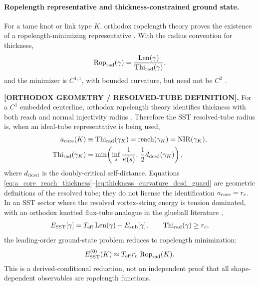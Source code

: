 \documentclass[11pt]{article}
\theoremstyle{definition}
\theoremstyle{plain}
\theoremstyle{remark}
\newcommand{\rc}{{r_c}}
\begin{document}
        \paragraph{Ropelength representative and thickness-constrained ground state.}
        For a tame knot or link type \(K\), orthodox ropelength theory proves the
        existence of a ropelength-minimizing representative
        \cite{CantarellaKusnerSullivan2002,DenneDiaoSullivan2006}.
        With the radius convention for thickness,
        \begin{align}
            \operatorname{Rop}_{\rm rad}(\gamma)
            =
            \frac{\operatorname{Len}(\gamma)}
                 {\operatorname{Thi}_{\rm rad}(\gamma)} ,
        \end{align}
        and the minimizer is \(C^{1,1}\), with bounded curvature, but need not be
        \(C^2\) \cite{CantarellaKusnerSullivan2002}.

        \textbf{[ORTHODOX GEOMETRY / RESOLVED-TUBE DEFINITION].}
        For a \(C^1\) embedded centerline, orthodox ropelength theory identifies
        thickness with both reach and normal injectivity radius
        \cite{CantarellaKusnerSullivan2002}.  Therefore the SST resolved-tube
        radius is, when an ideal-tube representative is being used,
        \begin{align}
            a_{\rm core}(K)
            &\equiv
            \operatorname{Thi}_{\rm rad}(\gamma_K)
            =
            \operatorname{reach}(\gamma_K)
            =
            \operatorname{NIR}(\gamma_K),
            \label{eq:a_core_reach_thickness}\\
            \operatorname{Thi}_{\rm rad}(\gamma_K)
            &=
            \min\!\left(\inf_s\frac{1}{\kappa(s)},\,
            \frac12 d_{\rm dcsd}(\gamma_K)\right),
            \label{eq:thickness_curvature_dcsd_guard}
        \end{align}
        where \(d_{\rm dcsd}\) is the doubly-critical self-distance.  Equations
        \eqref{eq:a_core_reach_thickness}--\eqref{eq:thickness_curvature_dcsd_guard}
        are geometric definitions of the resolved tube; they do not license the
        identification \(a_{\rm core}=\rc\).
        In an SST sector where the resolved vortex-string energy is
        tension dominated, with an orthodox knotted flux-tube analogue in the
        glueball literature \cite{BuniyKephart2003},
        \begin{align}
            E_{\rm SST}[\gamma]
            =
            T_{\rm eff}\operatorname{Len}(\gamma)
            +
            E_{\rm sub}[\gamma],
            \qquad
            \operatorname{Thi}_{\rm rad}(\gamma)\ge r_c ,
        \end{align}
        the leading-order ground-state problem reduces to ropelength minimization:
        \begin{align}
            E_{\rm SST}^{(0)}(K)
            \approx
            T_{\rm eff} r_c\,\operatorname{Rop}_{\rm rad}(K).
        \end{align}
        This is a derived-conditional reduction, not an independent proof that all
        shape-dependent observables are ropelength functions.
\end{document}
